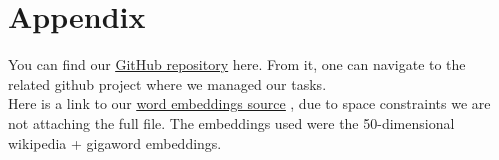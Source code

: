 \section{Appendix}
You can find our 
\href{https://github.com/Linux-Tech-Tips/sw_eng/tree/main}{\underline{GitHub repository}}
here. From it, one can navigate to the related github project where we managed our tasks.\\
Here is a link to our
\href{https://nlp.stanford.edu/projects/glove/}{\underline{word embeddings source}}
, due to space constraints we are not attaching the full file. The embeddings used were the 50-dimensional wikipedia + gigaword embeddings.

